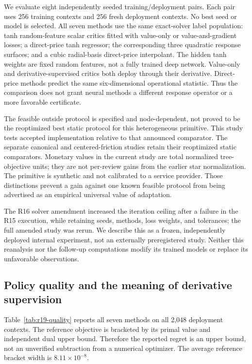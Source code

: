 \documentclass[11pt,letterpaper]{article}
\theoremstyle{definition}
\newcommand{\1}{\mathbf 1}
\begin{document}
We evaluate eight independently seeded training/deployment pairs. Each pair uses 256 training contexts and 256 fresh deployment contexts. No best seed or model is selected. All seven methods use the same exact-solver label population: tanh random-feature scalar critics fitted with value-only or value-and-gradient losses; a direct-price tanh regressor; the corresponding three quadratic response surfaces; and a cubic radial-basis direct-price interpolant. The hidden tanh weights are fixed random features, not a fully trained deep network. Value-only and derivative-supervised critics both deploy through their derivative. Direct-price methods predict the same six-dimensional operational statistic. Thus the comparison does not grant neural methods a different response operator or a more favorable certificate.

The feasible outside protocol is specified and node-dependent, not proved to be the reoptimized best static protocol for this heterogeneous primitive. This study tests accepted implementation relative to that announced comparator. The separate canonical and centered-friction studies retain their reoptimized static comparators. Monetary values in the current study are total normalized tree-objective units; they are not per-review gains from the earlier star normalization. The primitive is synthetic and not calibrated to a service provider. Those distinctions prevent a gain against one known feasible protocol from being advertised as an empirical universal value of adaptation.

The R16 solver amendment increased the iteration ceiling after a failure in the R15 execution, while retaining seeds, methods, loss weights, and tolerances; the full amended study was rerun. We describe this as a frozen, independently deployed internal experiment, not an externally preregistered study. Neither this reanalysis nor the follow-up computations modify its trained models or replace its unfavorable observations.

\subsection{Policy quality and the meaning of derivative supervision}
Table~\ref{tab:r19-quality} reports all seven methods on all 2,048 deployment contexts. The reference objective is bracketed by its primal value and independent dual upper bound. Therefore the reported regret is an upper bound, not an unverified subtraction from a numerical optimizer. The average reference bracket width is $8.11\times10^{-8}$.
\end{document}
